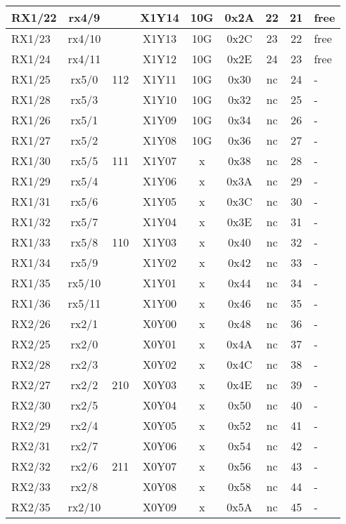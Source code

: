 \begin{longtable}{|l|c|c|c|c|c|c|c|l|}
RX1/22 & rx4/9  &     & X1Y14 & 10G & 0x2A & 22 & 21 & free\\\hline
RX1/23 & rx4/10 &     & X1Y13 & 10G & 0x2C & 23 & 22 & free\\\hline
RX1/24 & rx4/11 &     & X1Y12 & 10G & 0x2E & 24 & 23 & free\\\hline
RX1/25 & rx5/0  & 112 & X1Y11 & 10G & 0x30 & nc & 24 & -\\\hline
RX1/28 & rx5/3  &     & X1Y10 & 10G & 0x32 & nc & 25 & -\\\hline
RX1/26 & rx5/1  &     & X1Y09 & 10G & 0x34 & nc & 26 & -\\\hline
RX1/27 & rx5/2  &     & X1Y08 & 10G & 0x36 & nc & 27 & -\\\hline
RX1/30 & rx5/5  & 111 & X1Y07 &  x  & 0x38 & nc & 28 & -\\\hline
RX1/29 & rx5/4  &     & X1Y06 &  x  & 0x3A & nc & 29 & -\\\hline
RX1/31 & rx5/6  &     & X1Y05 &  x  & 0x3C & nc & 30 & -\\\hline
RX1/32 & rx5/7  &     & X1Y04 &  x  & 0x3E & nc & 31 & -\\\hline
RX1/33 & rx5/8  & 110 & X1Y03 &  x  & 0x40 & nc & 32 & -\\\hline
RX1/34 & rx5/9  &     & X1Y02 &  x  & 0x42 & nc & 33 & -\\\hline
RX1/35 & rx5/10 &     & X1Y01 &  x  & 0x44 & nc & 34 & -\\\hline
RX1/36 & rx5/11 &     & X1Y00 &  x  & 0x46 & nc & 35 & -\\\hline
RX2/26 & rx2/1  &     & X0Y00 &  x  & 0x48 & nc & 36 & -\\\hline
RX2/25 & rx2/0  &     & X0Y01 &  x  & 0x4A & nc & 37 & -\\\hline
RX2/28 & rx2/3  &     & X0Y02 &  x  & 0x4C & nc & 38 & -\\\hline
RX2/27 & rx2/2  & 210 & X0Y03 &  x  & 0x4E & nc & 39 & -\\\hline
RX2/30 & rx2/5  &     & X0Y04 &  x  & 0x50 & nc & 40 & -\\\hline
RX2/29 & rx2/4  &     & X0Y05 &  x  & 0x52 & nc & 41 & -\\\hline
RX2/31 & rx2/7  &     & X0Y06 &  x  & 0x54 & nc & 42 & -\\\hline
RX2/32 & rx2/6  & 211 & X0Y07 &  x  & 0x56 & nc & 43 & -\\\hline
RX2/33 & rx2/8  &     & X0Y08 &  x  & 0x58 & nc & 44 & -\\\hline
RX2/35 & rx2/10 &     & X0Y09 &  x  & 0x5A & nc & 45 & -\\\hline

\end{longtable}
